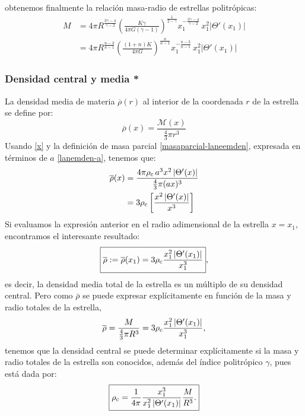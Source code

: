obtenemos finalmente la relación masa-radio de estrellas politrópicas:
\begin{equation}\label{masaradiopolitropico}
\boxed{
\begin{aligned}
 M&=4\pi R^{\frac{3\gamma-4}{\gamma-2}}\left(\frac{K\gamma}{4\pi G(\gamma-1)}\right)^{\frac{1}{2-\gamma}}x_1^{-\frac{3\gamma-4}{\gamma-2}}\,x_1^2\left|\Theta'(x_1)\right|\\
&=4\pi R^{\frac{n-3}{n-1}}\left(\frac{(1+n)K}{4\pi G}\right)^{\frac{n}{n-1}}x_1^{-\frac{n-3}{n-1}}\,x_1^2\left|\Theta'(x_1)\right|
\end{aligned}}
\end{equation}


\subsubsection{Densidad central y media *}
 La densidad media de materia $\overline{\rho}(r)$ al interior de la coordenada $r$ de la estrella se define por:
\begin{equation}\label{defin-densidadmedia}
 \overline{\rho}(x)=\frac{\mathcal{M}(x)}{\frac{4}{3}\pi r^3}
\end{equation}
Usando \eqref{x} y la definición de masa parcial \eqref{masaparcial-laneemden}, expresada en términos de $a$ \eqref{lanemden-a}, tenemos que:
\begin{align}
 \overline{\rho}(x)&=\frac{4\pi\rho_{\rm c}\, a^3 x^2\left|\Theta'(x)\right|}{\frac{4}{3}\pi(ax)^3}\\
 &=3\rho_{\rm c}\left[\frac{x^2\left|\Theta'(x)\right|}{x^3}\right]\label{densidadmedia1}
\end{align}
Si evaluamos la expresión anterior en el radio adimensional de la estrella $x=x_1$, encontramos el interesante resultado:
\begin{equation}\label{laneemden-densidadmedia}
\boxed{ \overline{\rho}:=\overline{\rho}(x_1)=3\rho_{\rm c}\frac{x_1^2\left|\Theta'(x_1)\right|}{x_1^3}},
\end{equation}
es decir, la densidad media total de la estrella es un múltiplo de su densidad central. Pero como $\bar{\rho}$ se puede expresar explícitamente en función de la masa y radio totales de la estrella,
\begin{equation}
 \overline{\rho}=\frac{M}{\frac{4}{3}\pi R^3}=3\rho_{\rm c}\frac{x_1^2\left|\Theta'(x_1)\right|}{x_1^3},
\end{equation}
tenemos que la densidad central se puede determinar explícitamente si la masa y radio totales de la estrella son conocidos, además del índice politrópico $\gamma$, pues está dada por:
\begin{equation}\label{densidad0politropica}
\boxed{ \rho_{\rm c}=\frac{1}{4\pi}\frac{x_1^3}{x_1^2\left|\Theta'(x_1)\right|}\frac{M}{R^3}.}
\end{equation}

